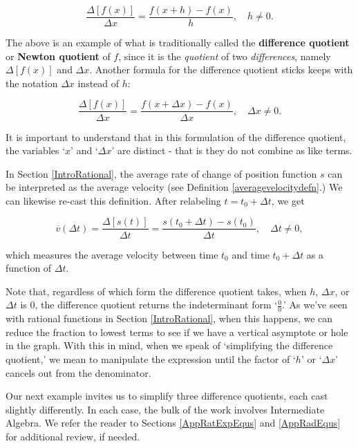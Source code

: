 \[ \dfrac{\Delta[f(x)]}{\Delta x} = \dfrac{f(x+h)-f(x)}{h}, \quad h \neq 0.\]

The above is an example of what is traditionally called the  \textbf{difference quotient}  or  \textbf{Newton quotient} of $f$, since it is the \textit{quotient} of two \textit{differences}, namely $\Delta[f(x)]$ and $\Delta x$. Another formula for the difference quotient sticks keeps with the notation $\Delta x$ instead of $h$:


\[ \dfrac{\Delta[f(x)]}{\Delta x} = \dfrac{f(x+\Delta x)-f(x)}{\Delta x}, \quad \Delta x \neq 0.\]


It is important to understand that in this formulation of the difference quotient, the variables `$x$' and `$\Delta x$' are distinct - that is they do not combine as like terms. 

In Section \ref{IntroRational},   the average rate of change of  position function $s$ can be interpreted as the average velocity (see Definition  \ref{averagevelocitydefn}.)  We can likewise re-cast this definition.  After relabeling $t = t_{0}+ \Delta t$, we get

\[ \overline{v}(\Delta t) = \dfrac{\Delta [s(t)]}{\Delta t} = \dfrac{s(t_{0} + \Delta t) - s(t_{0})}{\Delta t}, \quad \Delta t \neq 0, \]

which measures the average velocity between time $t_{0}$ and time $t_{0} + \Delta t$ as a function of $\Delta t$.

Note that, regardless of which form the difference quotient takes, when $h$,  $\Delta x$, or  $\Delta t$ is $0$, the difference quotient returns the indeterminant form `$\frac{0}{0}$.' As we've seen with rational functions in Section \ref{IntroRational}, when this happens, we can reduce the fraction to lowest terms to see if we have a vertical asymptote or hole in the graph.  With this in mind,  when we speak of `simplifying the difference quotient,' we mean to manipulate the expression until the factor of `$h$' or `$\Delta x$' cancels out from the denominator. 

Our next example invites us to simplify three difference quotients, each cast slightly differently.  In each case, the bulk of the work involves Intermediate Algebra. We refer the reader to Sections \ref{AppRatExpEqus} and \ref{AppRadEqus} for additional review, if needed.

